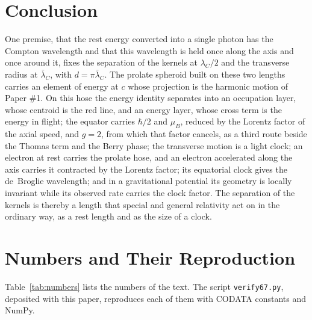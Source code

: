 \documentclass[%
 reprint, amsmath,amssymb, aps, prb, ]{revtex4-2}
\numberwithin{equation}{section}
\newcommand{\lamC}{\lambda_C}
\newcommand{\lbar}{\bar{\lambda}_C}
\begin{document}
\section{Conclusion}

One premise, that the rest energy converted into a single photon has the Compton wavelength and that this wavelength is held once along the axis and once around it, fixes the separation of the kernels at $\lamC/2$ and the transverse radius at $\lbar$, with $d = \pi\lbar$. The prolate spheroid built on these two lengths carries an element of energy at $c$ whose projection is the harmonic motion of Paper \#1. On this hose the energy identity separates into an occupation layer, whose centroid is the red line, and an energy layer, whose cross term is the energy in flight; the equator carries $\hbar/2$ and $\mu_B$, reduced by the Lorentz factor of the axial speed, and $g = 2$, from which that factor cancels, as a third route beside the Thomas term and the Berry phase; the transverse motion is a light clock; an electron at rest carries the prolate hose, and an electron accelerated along the axis carries it contracted by the Lorentz factor; its equatorial clock gives the de~Broglie wavelength; and in a gravitational potential its geometry is locally invariant while its observed rate carries the clock factor. The separation of the kernels is thereby a length that special and general relativity act on in the ordinary way, as a rest length and as the size of a clock.

\appendix

\section{Numbers and Their Reproduction}
\label{app:numbers}

Table~\ref{tab:numbers} lists the numbers of the text. The script \texttt{verify67.py}, deposited with this paper, reproduces each of them with CODATA constants and NumPy.
\end{document}
